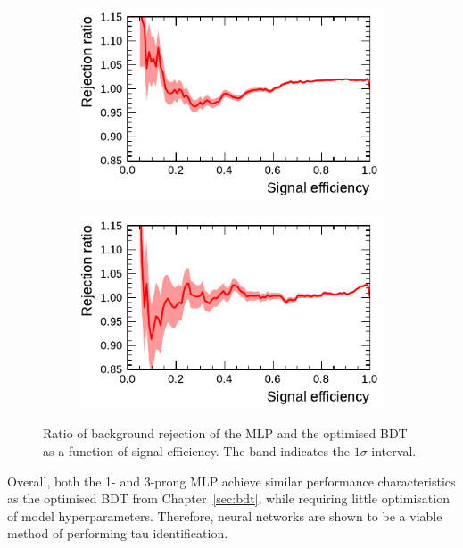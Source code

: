 \begin{figure}[htb]
  \begin{subfigure}[t]{0.48\textwidth}
    \centering
    \includegraphics{./figures/rnn/mlp/mlp_bdt_ratio_1p.pdf}
  \end{subfigure}\hfill
  \begin{subfigure}[t]{0.48\textwidth}
    \centering
    \includegraphics{./figures/rnn/mlp/mlp_bdt_ratio_3p.pdf}
  \end{subfigure}
  \caption[Ratio of background rejection for MLP and optimised BDT]{Ratio of
    background rejection of the MLP and the optimised BDT as a function of
    signal efficiency. The band indicates the $1\sigma$-interval.}
  \label{fig:roc_mlp_bdt_comparison}
\end{figure}

Overall, both the 1- and 3-prong MLP achieve similar performance characteristics
as the optimised BDT from Chapter~\ref{sec:bdt}, while requiring little
optimisation of model hyperparameters. Therefore, neural networks are shown to
be a viable method of performing tau identification.

